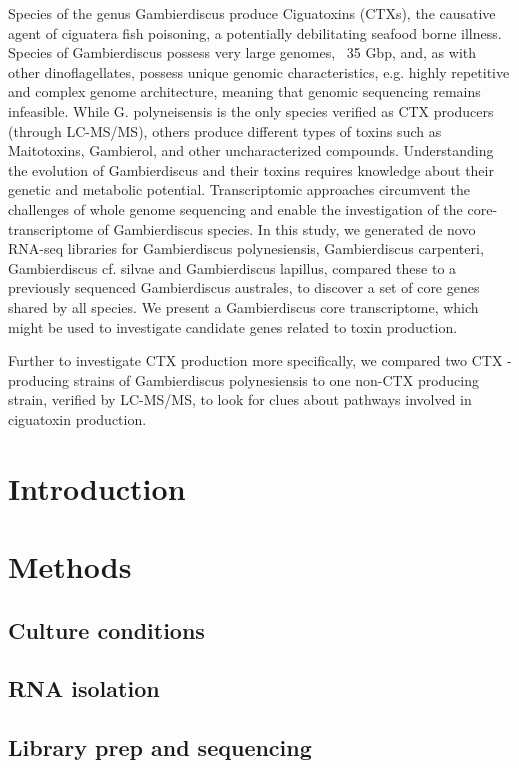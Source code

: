\documentclass[12pt]{article}
\begin{document}
Species of the genus Gambierdiscus produce Ciguatoxins (CTXs), the causative agent of ciguatera fish poisoning, a potentially debilitating seafood borne illness. Species of Gambierdiscus possess very large genomes, ~35 Gbp, and, as with other dinoflagellates, possess unique genomic characteristics, e.g. highly repetitive and complex genome architecture, meaning that genomic sequencing remains infeasible. While G. polyneisensis is the only species verified as CTX producers (through LC-MS/MS), others produce different types of toxins such as Maitotoxins, Gambierol, and other uncharacterized compounds. Understanding the evolution of Gambierdiscus and their toxins requires knowledge about their genetic and metabolic potential. Transcriptomic approaches circumvent the challenges of whole genome sequencing and enable the investigation of the core-transcriptome of Gambierdiscus species. In this study, we generated de novo RNA-seq libraries for  Gambierdiscus polynesiensis, Gambierdiscus carpenteri, Gambierdiscus cf. silvae and Gambierdiscus lapillus, compared these to a previously sequenced Gambierdiscus australes, to discover a set of core genes shared by all species. We present a Gambierdiscus core transcriptome, which might be used to investigate candidate genes related to toxin production.

Further to investigate CTX production more specifically, we compared two CTX -producing strains of Gambierdiscus polynesiensis to one non-CTX producing strain, verified by LC-MS/MS, to look for clues about pathways involved in ciguatoxin production.

\newpage
\section*{Introduction}

\newpage
\section*{Methods}

\subsection*{Culture conditions}
\subsection*{RNA isolation}
\subsection*{Library prep and sequencing}
\end{document}

